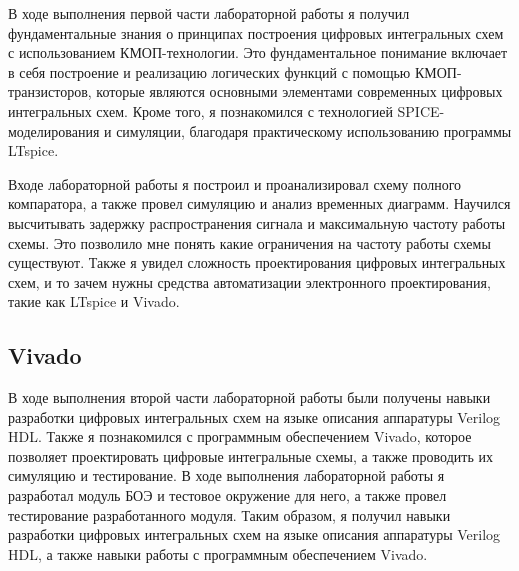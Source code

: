 \documentclass[12pt,onecolumn]{article}
\begin{document}
В ходе выполнения первой части лабораторной работы я получил фундаментальные знания о принципах построения цифровых интегральных схем с использованием КМОП-технологии.
Это фундаментальное понимание включает в себя построение и реализацию логических функций с помощью КМОП-транзисторов, которые являются основными элементами современных цифровых интегральных схем.
Кроме того, я познакомился с технологией SPICE-моделирования и симуляции, благодаря практическому использованию программы LTspice. 

Входе лабораторной работы я построил и проанализировал схему полного компаратора, а также провел симуляцию и анализ временных диаграмм.
Научился высчитывать задержку распространения сигнала и максимальную частоту работы схемы.
Это позволило мне понять какие ограничения на частоту работы схемы существуют. 
Также я увидел сложность проектирования цифровых интегральных схем, и то зачем нужны средства автоматизации электронного проектирования, такие как LTspice и Vivado.
\subsection{Vivado}

В ходе выполнения второй части лабораторной работы были получены навыки разработки цифровых интегральных схем на языке описания аппаратуры Verilog HDL.
Также я познакомился с программным обеспечением Vivado, которое позволяет проектировать цифровые интегральные схемы, а также проводить их симуляцию и тестирование.
В ходе выполнения лабораторной работы я разработал модуль БОЭ и тестовое окружение для него, а также провел тестирование разработанного модуля.
Таким образом, я получил навыки разработки цифровых интегральных схем на языке описания аппаратуры Verilog HDL, а также навыки работы с программным обеспечением Vivado.
\end{document}
